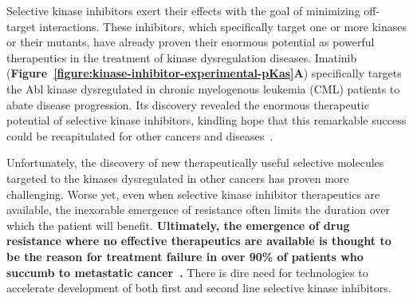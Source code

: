 \documentclass[11pt]{article}
\begin{document}
Selective kinase inhibitors exert their effects with the goal of minimizing off-target interactions.  
These inhibitors, which specifically target one or more kinases or their mutants, have already proven their enormous potential as powerful therapeutics in the treatment of kinase dysregulation diseases.
Imatinib ({\bf Figure~\ref{figure:kinase-inhibitor-experimental-pKas}A}) specifically targets the Abl kinase dysregulated in chronic myelogenous leukemia (CML) patients to abate disease progression. 
Its discovery revealed the enormous therapeutic potential of selective kinase inhibitors, kindling hope that this remarkable success could be recapitulated for other cancers and diseases~\cite{deininger:blood:2005:imatinib-development,stegmeier:clpt:2010:imatinib-lessons}.

Unfortunately, the discovery of new therapeutically useful selective molecules targeted to the kinases dysregulated in other cancers has proven more challenging.
Worse yet, even when selective kinase inhibitor therapeutics are available, the inexorable emergence of resistance often limits the duration over which the patient will  benefit.
{\bf Ultimately, the emergence of drug resistance where no effective therapeutics are available is thought to be the reason for treatment failure in over 90\% of patients who succumb to metastatic cancer~\cite{longley-johnston:j-pathol:2005:drug-resistance}.}
There is dire need for technologies to accelerate development of both first and second line selective kinase inhibitors.

%
\end{document}
